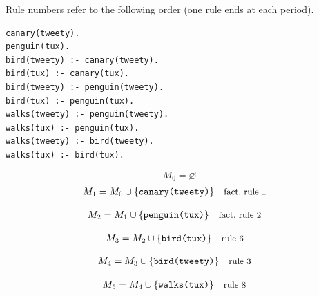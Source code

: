 \documentclass[a4paper,11pt]{article}
\newif\ifexplain
\newcommand{\explain}[1]{\ifexplain\begin{erklbox}#1\end{erklbox}\fi}
\newcommand{\why}[1]{\text{\small #1}}
\newcommand{\at}[1]{\texttt{#1}}
\begin{document}
Rule numbers refer to the following order (one rule ends at each period).
\begin{small}
\begin{verbatim}
canary(tweety).
penguin(tux).
bird(tweety) :- canary(tweety).
bird(tux) :- canary(tux).
bird(tweety) :- penguin(tweety).
bird(tux) :- penguin(tux).
walks(tweety) :- penguin(tweety).
walks(tux) :- penguin(tux).
walks(tweety) :- bird(tweety).
walks(tux) :- bird(tux).
\end{verbatim}
\end{small}
\explain{Beim Redukt bleibt die Kandidatenmenge fest. Wir entscheiden zuerst, welche Regeln wegfallen. Erst danach berechnen wir aus den verbleibenden positiven Regeln die kleinste abgeschlossene Menge. Ein Modell allein reicht nicht: Diese Menge muss genau der Kandidat sein.}
\[
M_0=\varnothing
\]
\begin{align*}
M_{1} &= M_{0}\cup \{\at{canary(tweety)}\} && \why{fact, rule 1}
\end{align*}
\explain{Diese Regel hat keinen Körper. Ihr Kopf $\at{canary(tweety)}$ ist damit ein Fakt und muss in die Menge.}
\begin{align*}
M_{2} &= M_{1}\cup \{\at{penguin(tux)}\} && \why{fact, rule 2}
\end{align*}
\explain{Diese Regel hat keinen Körper. Ihr Kopf $\at{penguin(tux)}$ ist damit ein Fakt und muss in die Menge.}
\begin{align*}
M_{3} &= M_{2}\cup \{\at{bird(tux)}\} && \why{rule 6}
\end{align*}
\explain{Für $\at{bird(tux)}$ brauchen wir $\at{penguin(tux)}$. Weil diese Voraussetzungen bereits hergeleitet sind, dürfen wir den Regelkopf jetzt aufnehmen und alle bisherigen Atome behalten; bei einer fehlenden Voraussetzung würde diese Regel dagegen noch nichts beitragen.}
\begin{align*}
M_{4} &= M_{3}\cup \{\at{bird(tweety)}\} && \why{rule 3}
\end{align*}
\explain{Für $\at{bird(tweety)}$ brauchen wir $\at{canary(tweety)}$. Weil diese Voraussetzungen bereits hergeleitet sind, dürfen wir den Regelkopf jetzt aufnehmen und alle bisherigen Atome behalten; bei einer fehlenden Voraussetzung würde diese Regel dagegen noch nichts beitragen.}
\begin{align*}
M_{5} &= M_{4}\cup \{\at{walks(tux)}\} && \why{rule 8}
\end{align*}
\explain{Für $\at{walks(tux)}$ brauchen wir $\at{penguin(tux)}$. Weil diese Voraussetzungen bereits hergeleitet sind, dürfen wir den Regelkopf jetzt aufnehmen und alle bisherigen Atome behalten; bei einer fehlenden Voraussetzung würde diese Regel dagegen noch nichts beitragen.}
\end{document}
